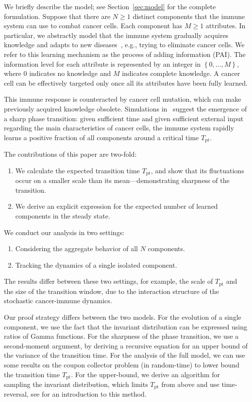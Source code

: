 \documentclass{article}
\numberwithin{equation}{section}
\newcommand{\gk}[1]{\left\{#1\right\}}
\newcommand{\1}{\mathbbm{1}}
\begin{document}
We briefly describe the model; see Section~\ref{sec:model} for the complete formulation. Suppose that there are $N\ge 1$ distinct components that the immune system can use to combat cancer cells. Each component has $M\ge 1$ attributes. In particular, we abstractly model that the immune system gradually acquires knowledge and adapts to new diseases~\cite{ParkinCohen}, e.g., trying to eliminate cancer cells. We refer to this learning mechanism as the process of adding information (PAI). The information level for each attribute is represented by an integer in $\gk{0,\ldots, M}$, where $0$ indicates no knowledge and $M$ indicates complete knowledge. A cancer cell can be effectively targeted only once all its attributes have been fully learned.

This immune response is counteracted by cancer cell mutation, which can make previously acquired knowledge obsolete. Simulations in~\cite{kuehn2025mathematicalmodelsselfadaptiveresponse} suggest the emergence of a sharp phase transition: given sufficient time and given sufficient external input regarding the main characteristics of cancer cells, the immune system rapidly learns a positive fraction of all components around a critical time $T_{\mathrm{pt}}$.

The contributions of this paper are two-fold:
\begin{enumerate}
\item We calculate the expected transition time $T_{\mathrm{pt}}$, and show that its fluctuations occur on a smaller scale than its mean---demonstrating sharpness of the transition.
\item We derive an explicit expression for the expected number of learned components in the steady state.
\end{enumerate}

We conduct our analysis in two settings:
\begin{enumerate}
\item Considering the aggregate behavior of all $N$ components.
\item Tracking the dynamics of a single isolated component.
\end{enumerate}
The results differ between these two settings, for example, the scale of $T_{\mathrm{pt}}$ and the size of the transition window, due to the interaction structure of the stochastic cancer-immune dynamics.

Our proof strategy differs between the two models. For the evolution of a single component, we use the fact that the invariant distribution can be expressed using ratios of Gamma functions. For the sharpness of the phase transition, we use a second-moment argument, by deriving a recursive equation for an upper bound of the variance of the transition time. For the analysis of the full model, we can use some results on the coupon collector problem (in random-time) to lower bound the transition time $T_{\mathrm{pt}}$. For the upper-bound, we derive an algorithm for sampling the invariant distribution, which limits $T_{\mathrm{pt}}$ from above and use time-reversal, see \cite[Chapter 10]{chung2005markov} for an introduction to this method. 
\end{document}
